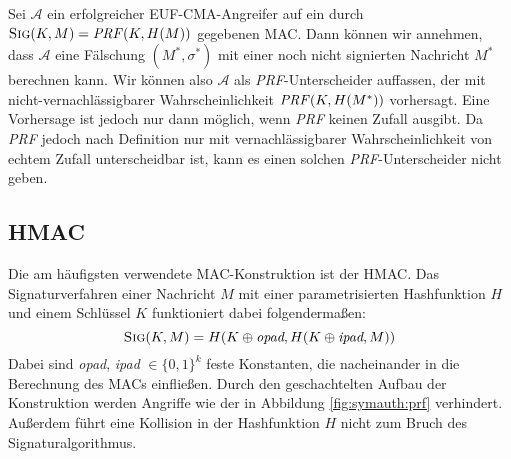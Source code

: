 \begin{beweis}[Entwurf]
Sei $\mathcal{A}$ ein erfolgreicher EUF-CMA-Angreifer auf ein durch $\textsc{Sig}(K,M) = \text{\textit{PRF}}(K,H(M))$ gegebenen MAC. Dann können wir annehmen,
dass $\mathcal{A}$ eine Fälschung $(M^*,\sigma^*)$ mit einer noch nicht signierten Nachricht $M^*$ berechnen kann. Wir können also $\mathcal{A}$ als
\textit{PRF}-Unterscheider auffassen, der mit nicht-vernachlässigbarer Wahrscheinlichkeit $\text{\textit{PRF}}(K,H(M^*))$ vorhersagt. Eine Vorhersage ist jedoch
nur dann möglich, wenn \textit{PRF} keinen Zufall ausgibt. Da \textit{PRF} jedoch nach Definition nur mit vernachlässigbarer Wahrscheinlichkeit von echtem
Zufall unterscheidbar ist, kann es einen solchen \textit{PRF}-Unterscheider nicht geben.
\end{beweis}

\subsection{HMAC}
Die am häufigsten verwendete MAC-Konstruktion ist der HMAC. Das Signaturverfahren einer Nachricht $M$ mit einer parametrisierten Hashfunktion $H$ und einem
Schlüssel $K$ funktioniert dabei folgendermaßen:
\begin{equation*}
\textsc{Sig}(K,M) = H(K \oplus \textit{opad}, H(K \oplus \textit{ipad}, M))
\end{equation*}
Dabei sind \emph{opad}, \emph{ipad} $\in \{0,1\}^k$ feste Konstanten, die nacheinander in die Berechnung des MACs einfließen. Durch den geschachtelten Aufbau
der Konstruktion werden Angriffe wie der in Abbildung \ref{fig:symauth:prf} verhindert. Außerdem führt eine Kollision in der Hashfunktion $H$ nicht zum
Bruch des Signaturalgorithmus.
